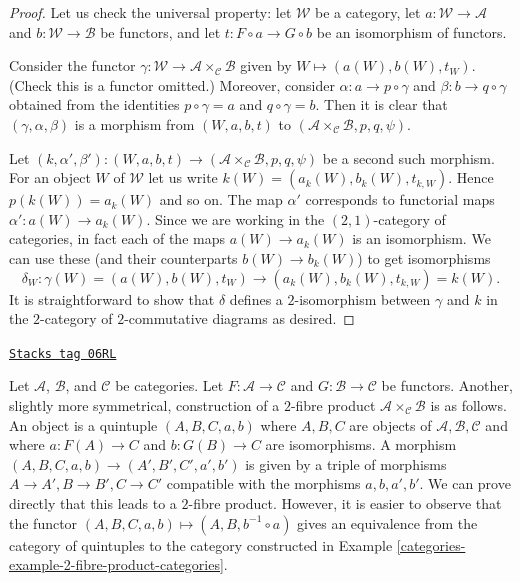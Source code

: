 \begin{proof}
Let us check the universal property:
let $\mathcal{W}$ be a category, let
$a : \mathcal{W} \to \mathcal{A}$ and
$b : \mathcal{W} \to \mathcal{B}$ be functors, and
let $t : F \circ a \to G \circ b$ be an isomorphism of functors.

\medskip\noindent
Consider the functor
$\gamma : \mathcal{W} \to \mathcal{A} \times_\mathcal{C}\mathcal{B}$
given by $W \mapsto (a(W), b(W), t_W)$.
(Check this is a functor omitted.)
Moreover, consider $\alpha : a \to p \circ \gamma$ and
$\beta : b \to q \circ \gamma$ obtained from the identities
$p \circ \gamma = a$ and $q \circ \gamma = b$. Then it is
clear that $(\gamma, \alpha, \beta)$ is a morphism
from $(W, a, b, t)$ to
$(\mathcal{A} \times_\mathcal{C} \mathcal{B}, p, q, \psi)$.

\medskip\noindent
Let
$(k, \alpha', \beta') :
(W, a, b, t) \to (\mathcal{A} \times_\mathcal{C} \mathcal{B}, p, q, \psi)$
be a second such morphism. For an object $W$ of $\mathcal{W}$ let us write
$k(W) = (a_k(W), b_k(W), t_{k, W})$. Hence $p(k(W)) = a_k(W)$ and so on.
The map $\alpha'$ corresponds to functorial maps
$\alpha' : a(W) \to a_k(W)$. Since we are working in the
$(2, 1)$-category of categories, in fact each of the maps
$a(W) \to a_k(W)$ is an isomorphism. We can use these
(and their counterparts $b(W) \to b_k(W)$) to get isomorphisms
$$
\delta_W :
\gamma(W) = (a(W), b(W), t_W)
\longrightarrow
(a_k(W), b_k(W), t_{k, W}) = k(W).
$$
It is straightforward to show that $\delta$ defines a
$2$-isomorphism between $\gamma$ and $k$ in the $2$-category
of $2$-commutative diagrams as desired.
\end{proof}

\begin{remark}
\label{categories-remark-other-description-2-fibre-product}
\href{https://stacks.math.columbia.edu/tag/06RL}{\texttt{Stacks tag 06RL}}

Let $\mathcal{A}$, $\mathcal{B}$, and $\mathcal{C}$ be categories.
Let $F : \mathcal{A} \to \mathcal{C}$ and $G : \mathcal{B} \to \mathcal{C}$
be functors. Another, slightly more symmetrical, construction of a $2$-fibre
product $\mathcal{A} \times_\mathcal{C} \mathcal{B}$ is as follows.
An object is a quintuple $(A, B, C, a, b)$ where $A, B, C$ are objects
of $\mathcal{A}, \mathcal{B}, \mathcal{C}$ and where $a : F(A) \to C$
and $b : G(B) \to C$ are isomorphisms. A morphism
$(A, B, C, a, b) \to (A', B', C', a', b')$ is given by a triple
of morphisms $A \to A', B \to B', C \to C'$ compatible with the morphisms
$a, b, a', b'$. We can prove directly that this leads to a $2$-fibre
product. However, it is easier to observe that the functor
$(A, B, C, a, b) \mapsto (A, B, b^{-1} \circ a)$ gives an equivalence
from the category of quintuples to the category constructed in
Example \ref{categories-example-2-fibre-product-categories}.
\end{remark}

